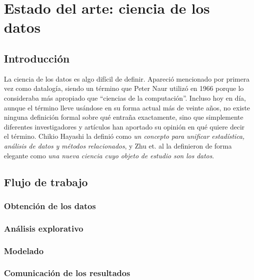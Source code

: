 \section{Estado del arte: ciencia de los datos}
\label{sec:state_dataScience}

\subsection{Introducción}
\label{subsec:state_dataScience_intro}

La ciencia de los datos es algo difícil de definir. Apareció mencionado por
primera vez como datalogía, siendo un término que Peter Naur utilizó en 1966
porque lo consideraba más apropiado que ``ciencias de la computación''. Incluso
hoy en día, aunque el término lleve usándose en su forma actual más de veinte
años, no existe ninguna definición formal sobre qué entraña exactamente, sino
que simplemente diferentes investigadores y artículos han aportado su opinión en
qué quiere decir el término. Chikio Hayashi \cite{Hayashi1998} la definió como
\emph{un concepto para unificar estadística, análisis de datos y métodos
  relacionados}, y Zhu et. al \cite{Zhu2011} la definieron de forma elegante
como \emph{una nueva ciencia cuyo objeto de estudio son los datos}.


\subsection{Flujo de trabajo}
\label{subsec:state_dataScience_workflow}

\subsubsection{Obtención de los datos}
\label{subsec:state_dataScience_workflow_1}

\subsubsection{Análisis explorativo}
\label{subsec:state_dataScience_workflow_2}

\subsubsection{Modelado}
\label{subsec:state_dataScience_workflow_3}

\subsubsection{Comunicación de los resultados}
\label{subsec:state_dataScience_workflow_4}





